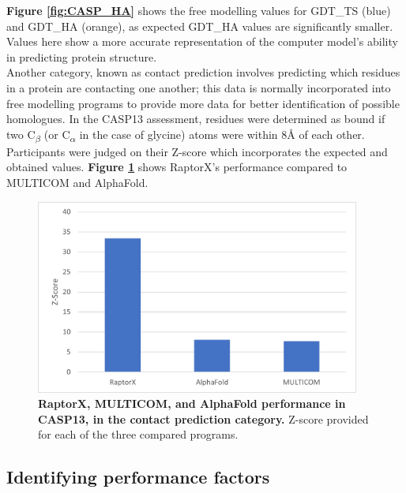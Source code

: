 \textbf{Figure \ref{fig:CASP_HA}} shows the free modelling values for GDT\_TS (blue) and GDT\_HA (orange), as expected GDT\_HA values are significantly smaller. Values here show a more accurate representation of the computer model's ability in predicting protein structure.
\\[12pt]
Another category, known as contact prediction involves predicting which residues in a protein are contacting one another; this data is normally incorporated into free modelling programs to provide more data for better identification of possible homologues. In the CASP13 assessment, residues were determined as bound if two C\textsubscript{$\beta$} (or C\textsubscript{$\alpha$} in the case of glycine) atoms were within 8Å of each other. Participants were judged on their Z-score which incorporates the expected and obtained values. \textbf{Figure \ref{fig:CASP_contact}} shows RaptorX's performance compared to MULTICOM and AlphaFold.

\begin{figure}[h!]
    \begin{small}
        \begin{center}
            \includegraphics[width=0.95\textwidth]{images/CASP_contact.png}
        \end{center}
        \caption{\textbf{RaptorX, MULTICOM, and AlphaFold performance in CASP13, in the contact prediction category.} Z-score provided for each of the three compared programs.}
        \label{fig:CASP_contact}
    \end{small}
\end{figure}


\subsection{Identifying performance factors} 


